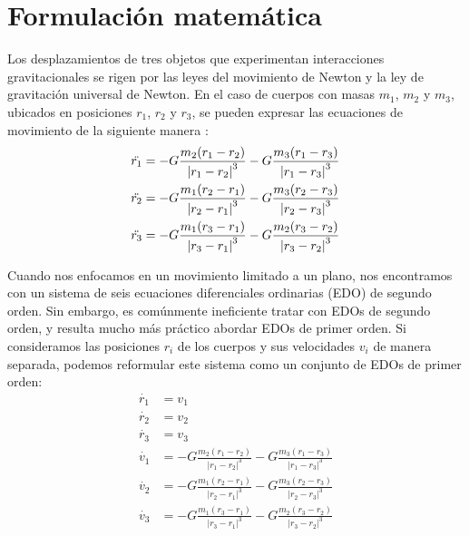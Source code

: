 \documentclass{article}
\begin{document}
 
\section{Formulación matemática}
Los desplazamientos de tres objetos que experimentan 
interacciones gravitacionales se rigen por las leyes 
del movimiento de Newton y la ley de gravitación 
universal de Newton. En el caso de cuerpos con 
masas $m_1$, $m_2$ y $m_3$, ubicados en 
posiciones $r_1$, $r_2$ y $r_3$, se pueden 
expresar las ecuaciones de movimiento de la 
siguiente manera \cite{montgomery2001new}: \\


\begin{equation}
    \begin{split}
    \Ddot{r_1} = -G \frac{m_2(r_1 - r_2 )}{{| r_1 - r_2 |}^3} - G \frac{m_3(r_1 - r_3)}{{| r_1 - r_3 |}^3}  \\
    \Ddot{r_2} = -G \frac{m_1(r_2 - r_1 )}{{| r_2 - r_1 |}^3} - G \frac{m_3(r_2 - r_3)}{{| r_2 - r_3 |}^3} \\
    \Ddot{r_3} = -G \frac{m_1(r_3 - r_1 )}{{| r_3 - r_1 |}^3} - G \frac{m_2(r_3 - r_2)}{{| r_3 - r_2 |}^3}
    \end{split}
\end{equation}


Cuando nos enfocamos en un movimiento limitado a un plano, nos 
encontramos con un sistema de seis ecuaciones diferenciales 
ordinarias (EDO) de segundo orden. Sin embargo, es comúnmente 
ineficiente tratar con EDOs de segundo orden, y resulta 
mucho más práctico abordar EDOs de primer orden. 
Si consideramos las posiciones $r_i$ de los cuerpos y sus velocidades $v_i$ 
de manera separada, podemos reformular este sistema como un 
conjunto de EDOs de primer orden: \\


\begin{equation}
    \begin{split}
    \dot{r_1} &= v_1 \\
    \dot{r_2} &= v_2 \\
    \dot{r_3} &= v_3 \\
    \dot{v_1} &= -G \frac{m_2(r_1 - r_2 )}{{| r_1 - r_2 |}^3} - G \frac{m_3(r_1 - r_3)}{{| r_1 - r_3 |}^3}  \\
    \dot{v_2} &= -G \frac{m_1(r_2 - r_1 )}{{| r_2 - r_1 |}^3} - G \frac{m_3(r_2 - r_3)}{{| r_2 - r_3 |}^3} \\
    \dot{v_3} &= -G \frac{m_1(r_3 - r_1 )}{{| r_3 - r_1 |}^3} - G \frac{m_2(r_3 - r_2)}{{| r_3 - r_2 |}^3}
    \end{split}
\end{equation}
\end{document}
